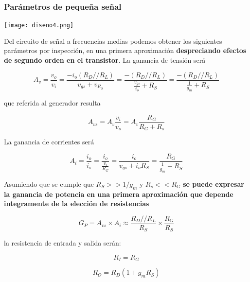 \begin{multicols}{2}
        \subsubsection{Parámetros de pequeña señal}



        \begin{center}
                   \texttt{[image: diseno4.png]}
                   \label{fig:circuito_senal}
        \end{center}



        Del circuito de señal a frecuencias medias podemos obtener los siguientes parámetros por inspección, en una primera aproximación \textbf{despreciando efectos de segundo orden en el transistor}.
        La ganancia de tensión será

        \begin{equation}
        A_v = \frac{v_o}{v_i} = \frac{-i_o(R_D // R_L)}{v_{gs}+ v_{R_S}} = \frac{-(R_D//R_L)}{\frac{v_{gs}}{i_o}+R_S} = \frac{-(R_D//R_L)}{\frac{1}{g_m}+R_S}
        \end{equation}

        que referida al generador resulta

        \begin{equation}
        A_{vs} = A_v \frac{v_i}{v_s} = A_v \frac{R_G}{R_G + R_s}
        \end{equation}

        La ganancia de corrientes será

        \begin{equation}
        A_i = \frac{i_o}{i_s} = \frac{i_o}{\frac{v_i}{R_G}} = \frac{i_o}{v_{gs}+i_o R_S} = \frac{R_G}{\frac{1}{g_m}+R_S}
        \end{equation}

        Asumiendo que se cumple que $R_S >> 1/g_m$ y $R_s << R_G$ \textbf{se puede expresar la ganancia de potencia en una primera aproximación que depende integramente de la elección de resistencias}

        \begin{equation}
        G_P = A_{vs}\times A_i \approx \frac{R_D//R_L}{R_S} \times \frac{R_G}{R_S}
        \end{equation}


        la resistencia de entrada y salida serán:

        \begin{equation}
        R_I = R_G
        \end{equation}

        \begin{equation}
        R_O = R_D(1+g_mR_S)
        \end{equation}

      \end{multicols}
        \newpage


